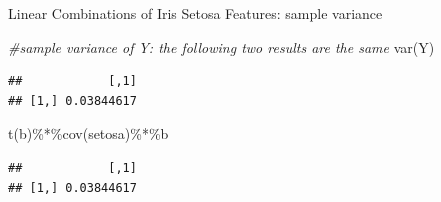 \documentclass[
  ignorenonframetext,
]{beamer}
\newenvironment{Shaded}{\begin{snugshade}}{\end{snugshade}}
\newcommand{\CommentTok}[1]{\textcolor[rgb]{0.56,0.35,0.01}{\textit{#1}}}
\newcommand{\FunctionTok}[1]{\textcolor[rgb]{0.00,0.00,0.00}{#1}}
\newcommand{\NormalTok}[1]{#1}
\newcommand{\SpecialCharTok}[1]{\textcolor[rgb]{0.00,0.00,0.00}{#1}}
\begin{document}
\begin{frame}[fragile]{Linear Combinations of Iris Setosa Features:
sample variance}
\protect\hypertarget{linear-combinations-of-iris-setosa-features-sample-variance}{}
\begin{Shaded}
\begin{Highlighting}[]
\CommentTok{\#sample variance of Y: the following two results are the same}
\FunctionTok{var}\NormalTok{(Y)}
\end{Highlighting}
\end{Shaded}

\begin{verbatim}
##            [,1]
## [1,] 0.03844617
\end{verbatim}

\begin{Shaded}
\begin{Highlighting}[]
\FunctionTok{t}\NormalTok{(b)}\SpecialCharTok{\%*\%}\FunctionTok{cov}\NormalTok{(setosa)}\SpecialCharTok{\%*\%}\NormalTok{b}
\end{Highlighting}
\end{Shaded}

\begin{verbatim}
##            [,1]
## [1,] 0.03844617
\end{verbatim}
\end{frame}
\end{document}
